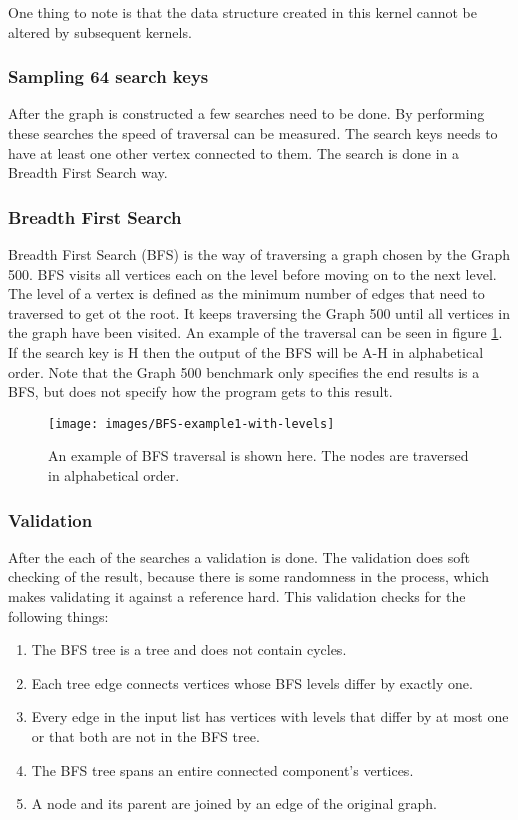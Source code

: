 One thing to note is that the data structure created in this kernel cannot be altered by subsequent kernels. 

\subsubsection{Sampling 64 search keys}
After the graph is constructed a few searches need to be done. By performing these searches the speed of traversal can be measured. The search keys needs to have at least one other vertex connected to them. The search is done in a Breadth First Search way.

\subsubsection{Breadth First Search}
Breadth First Search\cite{bfs} (BFS) is the way of traversing a graph chosen by the Graph 500. BFS visits all vertices each on the level before moving on to the next level. The level of a vertex is defined as the minimum number of edges that need to traversed to get ot the root. It keeps traversing the Graph 500 until all vertices in the graph have been visited. An example of the traversal can be seen in figure \ref{fig:bfs}. If the search key is H then the output of the BFS will be A-H in alphabetical order.
Note that the Graph 500 benchmark only specifies the end results is a BFS, but does not specify how the program gets to this result.
\begin{figure}[!h]
	\texttt{[image: images/BFS-example1-with-levels]}
	\caption{An example of BFS traversal is shown here. The nodes are traversed in alphabetical order.}
	\label{fig:bfs}
\end{figure}

\subsubsection{Validation}
After the each of the searches a validation is done. The validation does soft checking of the result, because there is some randomness in the process, which makes validating it against a reference hard. This validation checks for the following things:
\begin{enumerate}
\item The BFS tree is a tree and does not contain cycles.
\item Each tree edge connects vertices whose BFS levels differ by exactly one.
\item Every edge in the input list has vertices with levels that differ by at most one or that both are not in the BFS tree.
\item The BFS tree spans an entire connected component's vertices.
\item A node and its parent are joined by an edge of the original graph.
\end{enumerate}


